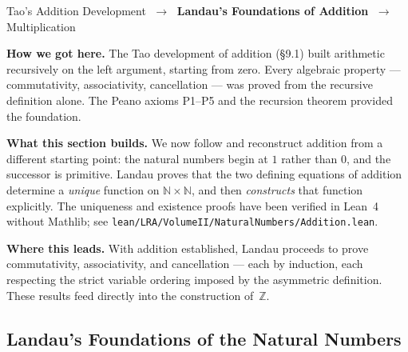 %
%

\begin{tcolorbox}[colback=gray!6, colframe=gray!40, arc=2pt,
  left=8pt, right=8pt, top=6pt, bottom=6pt,
  title={\small\textbf{Where You Are in the Journey}},
  fonttitle=\small\bfseries]
\begin{center}\small
  Tao's Addition Development $\;\to\;$ \textbf{Landau's Foundations of Addition}
  $\;\to\;$ Multiplication
\end{center}
\medskip
\noindent\textbf{How we got here.}
The Tao development of addition (§9.1) built arithmetic recursively on the
left argument, starting from zero. Every algebraic property --- commutativity,
associativity, cancellation --- was proved from the recursive definition alone.
The Peano axioms P1--P5 and the recursion theorem provided the foundation.

\medskip
\noindent\textbf{What this section builds.}
We now follow \textcite{LandauFoundationsAnalysis} and reconstruct addition
from a different starting point: the natural numbers begin at $1$ rather than
$0$, and the successor is primitive. Landau proves that the two defining
equations of addition determine a \emph{unique} function on
$\mathbb{N} \times \mathbb{N}$, and then \emph{constructs} that function
explicitly. The uniqueness and existence proofs have been verified in
Lean~4 without Mathlib; see
\texttt{lean/LRA/VolumeII/NaturalNumbers/Addition.lean}.

\medskip
\noindent\textbf{Where this leads.}
With addition established, Landau proceeds to prove commutativity,
associativity, and cancellation --- each by induction, each respecting the
strict variable ordering imposed by the asymmetric definition. These results
feed directly into the construction of~$\mathbb{Z}$.
\end{tcolorbox}
\vspace{1em}

\subsection*{Landau's Foundations of the Natural Numbers}

